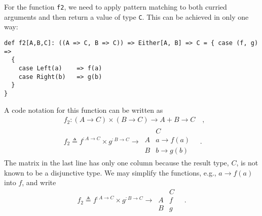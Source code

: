 For the function \lstinline!f2!, we need to apply pattern matching
to both curried arguments and then return a value of type \lstinline!C!.
This can be achieved in only one way:
\begin{lstlisting}
def f2[A,B,C]: ((A => C, B => C)) => Either[A, B] => C = { case (f, g) =>
  {
    case Left(a)    => f(a)
    case Right(b)   => g(b)
  }
}
\end{lstlisting}
A code notation for this function can be written as
\begin{align*}
 & f_{2}:\left(A\rightarrow C\right)\times\left(B\rightarrow C\right)\rightarrow A+B\rightarrow C\quad,\\
 & f_{2}\triangleq f^{:A\rightarrow C}\times g^{:B\rightarrow C}\rightarrow\,\begin{array}{|c||c|}
 & C\\
\hline A & a\rightarrow f(a)\\
B & b\rightarrow g(b)
\end{array}\quad.
\end{align*}
The matrix in the last line has only one column because the result
type, $C$, is not known to be a disjunctive type. We may simplify
the functions, e.g., $a\rightarrow f(a)$ into $f$, and write
\[
f_{2}\triangleq f^{:A\rightarrow C}\times g^{:B\rightarrow C}\rightarrow\,\begin{array}{|c||c|}
 & C\\
\hline A & f\\
B & g
\end{array}\quad.
\]

